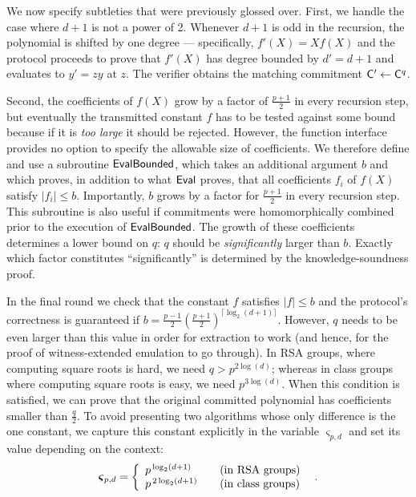 We now specify subtleties that were previously glossed over. 
First, we handle the case where $d+1$ is not a power of 2.  Whenever $d+1$ is odd in the recursion, the polynomial is shifted by one degree --- specifically, $f'(X) = X f(X)$ and the protocol proceeds to prove that $f'(X)$ has degree bounded by $d' = d+1$ and evaluates to $y' = zy$ at $z$. The verifier obtains the matching commitment $\mathsf{C}'\gets\mathsf{C}^q$.

Second, the coefficients of $f(X)$ grow by a factor of $\frac{p+1}{2}$ in every recursion step, but eventually the transmitted constant $f$ has to be tested against some bound because if it is \emph{too large} it should be rejected. However, the function interface provides no option to specify the allowable size of coefficients. We therefore define and use a subroutine $\textsf{{EvalBounded}}$, which takes an additional argument $b$ and which proves, in addition to what $\textsf{{Eval}}$ proves, that all coefficients $f_i$ of $f(X)$ satisfy $|f_i| \leq b$. Importantly, $b$ grows by a factor for $\frac{p+1}{2}$ in every recursion step. This subroutine is also useful if commitments were homomorphically combined prior to the execution of $\textsf{{EvalBounded}}$. The growth of these coefficients determines a lower bound on $q$: $q$ should be \emph{significantly} larger than $b$. Exactly which factor constitutes ``significantly'' is determined by the knowledge-soundness proof.

In the final round we check that the constant $f$ satisfies $|f|\leq b$ and the protocol's correctness is guaranteed if $b = \frac{p-1}{2}(\frac{p+1}{2})^{\lceil\log_2(d+1)\rceil}$. However, $q$ needs to be even larger than this value in order for extraction to work (and hence, for the proof of witness-extended emulation to go through). In RSA groups, where computing square roots is hard, we need $q>p^{2\log(d)}$; whereas in class groups where computing square roots is easy, we need $p^{3\log(d)}$. When this condition is satisfied, we can prove that the original committed polynomial has coefficients smaller than $\frac{q}{2}$. To avoid presenting two algorithms whose only difference is the one constant, we capture this constant explicitly in the variable $\boldsymbol{\varsigma}_{p,d}$ and set its value depending on the context:
\[
    \boldsymbol{\varsigma}_{p, d} = \left\{
        \begin{array}{ll}
            p^{\,\log_2(d+1)} & \quad \textnormal{(in RSA groups)} \\
            p^{\,2\log_2(d+1)} & \quad \textnormal{(in class groups)}
        \end{array}
    \right. \enspace .
\]

